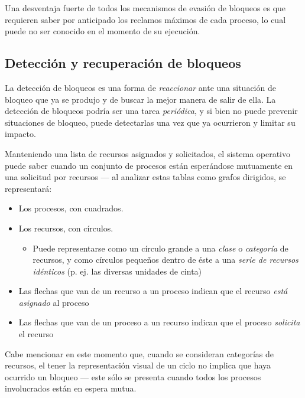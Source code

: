 \documentclass[11pt,fleqn]{book} %
\begin{document}
Una desventaja fuerte de todos los mecanismos de evasión de bloqueos
es que requieren saber por anticipado los reclamos máximos de cada
proceso, lo cual puede no ser conocido en el momento de su ejecución.
\subsection{Detección y recuperación de bloqueos}
\label{sec-3-4-3}
\label{PROC_det_y_rec_bloq}


La detección de bloqueos es una forma de \emph{reaccionar} ante una
situación de bloqueo que ya se produjo y de buscar la mejor manera de
salir de ella. La detección de bloqueos podría ser una tarea
\emph{periódica}, y si bien no puede prevenir situaciones de bloqueo, puede
detectarlas una vez que ya ocurrieron y limitar su impacto.

Manteniendo una lista de recursos asignados y solicitados, el sistema
operativo puede saber cuando un conjunto de procesos están esperándose
mutuamente en una solicitud por recursos — al analizar estas tablas
como grafos dirigidos, se representará:

\begin{itemize}
\item Los procesos, con cuadrados.
\item Los recursos, con círculos.
\begin{itemize}
\item Puede representarse como un círculo grande a una \emph{clase} o
    \emph{categoría} de recursos, y como círculos pequeños dentro de éste a
    una \emph{serie de recursos idénticos} (p. ej. las diversas unidades de
    cinta)
\end{itemize}
\item Las flechas que van de un recurso a un proceso indican que el
  recurso \emph{está asignado} al proceso
\item Las flechas que van de un proceso a un recurso indican que el
  proceso \emph{solicita} el recurso
\end{itemize}

Cabe mencionar en este momento que, cuando se consideran categorías de
recursos, el tener la representación visual de un ciclo no implica
que haya ocurrido un bloqueo — este sólo se presenta cuando todos
los procesos involucrados están en espera mutua.
\end{document}
